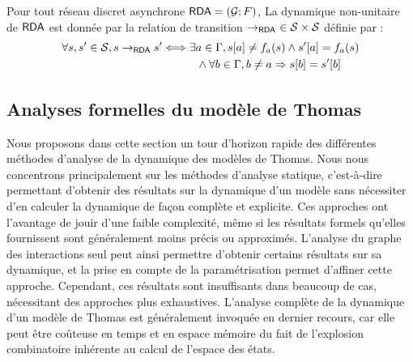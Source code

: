 \begin{definition}
  Pour tout réseau discret asynchrone $\mathsf{RDA} = (\mathcal{G}; F)$,
  La dynamique non-unitaire de $\mathsf{RDA}$ est donnée par la relation de transition
  $\rightarrow_{\mathsf{RDA}}\ \in \mathcal{S} \times \mathcal{S}$ définie par :
  \begin{align*}
    \forall s, s' \in \mathcal{S}, s \rightarrow_{\mathsf{RDA}} s'
      &\Longleftrightarrow \exists a \in \Gamma,
    {s[a]} \neq f_a(s) \wedge
      {s'[a]} = f_a(s) \\
      &\qquad\quad \wedge \forall b \in \Gamma, b \neq a \Rightarrow {s[b]} = {s'[b]}
  \end{align*}
\end{definition}



\subsection{Analyses formelles du modèle de Thomas}

Nous proposons dans cette section un tour d'horizon rapide des différentes méthodes
d'analyse de la dynamique des modèles de Thomas.
Nous nous concentrons principalement sur les méthodes d'analyse statique,
c'est-à-dire permettant d'obtenir des résultats sur la dynamique d'un modèle
sans nécessiter d'en calculer la dynamique de façon complète et explicite.
Ces approches ont l'avantage de jouir d'une faible complexité, même si les résultats formels
qu'elles fournissent sont généralement moins précis ou approximés.
L'analyse du graphe des interactions seul peut ainsi permettre d'obtenir certains
résultats sur sa dynamique,
et la prise en compte de la paramétrisation permet d'affiner cette approche.
Cependant, ces résultats sont insuffisants dans beaucoup de cas,
nécessitant des approches plus exhaustives.
L'analyse complète de la dynamique d'un modèle de Thomas
est généralement invoquée en dernier recours, car elle peut être coûteuse en temps
et en espace mémoire du fait de l'explosion combinatoire inhérente au calcul
de l'espace des états.

